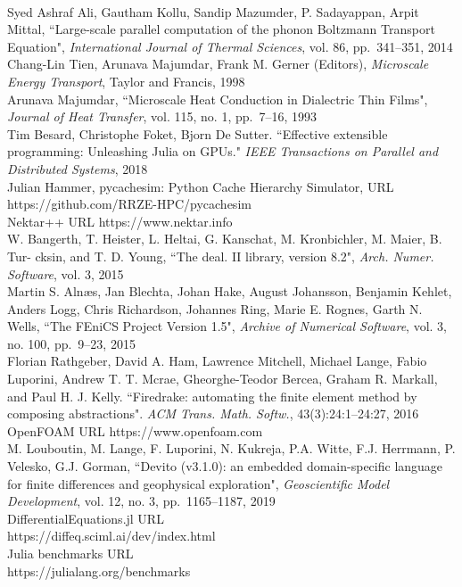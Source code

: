 \documentclass[twoside,leqno,twocolumn]{article}
\begin{document}
\begin{thebibliography}{99}
\\
Syed Ashraf Ali, Gautham Kollu, Sandip Mazumder, P. Sadayappan, Arpit Mittal,
``Large-scale parallel computation of the phonon Boltzmann Transport Equation",
{\em International Journal of Thermal Sciences}, vol. 86, pp.~341--351, 2014
\\
Chang-Lin Tien, Arunava Majumdar, Frank M. Gerner (Editors), {\em Microscale Energy Transport}, Taylor
and Francis, 1998
\\
Arunava Majumdar, ``Microscale Heat Conduction in Dialectric Thin Films", {\em Journal of Heat Transfer}, vol. 115, no. 1, pp.~7--16, 1993
\\
Tim Besard, Christophe Foket, Bjorn De Sutter. ``Effective extensible programming: Unleashing Julia on GPUs." {\em IEEE Transactions on Parallel and Distributed Systems}, 2018
\\
Julian Hammer, pycachesim: Python Cache Hierarchy Simulator, URL https://github.com/RRZE-HPC/pycachesim
\\
Nektar++ URL https://www.nektar.info
\\
W. Bangerth, T. Heister, L. Heltai, G. Kanschat, M. Kronbichler, M. Maier, B. Tur-
cksin, and T. D. Young, ``The deal. II library, version 8.2", {\em Arch. Numer. Software}, vol. 3, 2015
\\
Martin S. Aln{\ae}s, Jan Blechta, Johan Hake, August Johansson, Benjamin Kehlet, Anders Logg, Chris Richardson, Johannes Ring, Marie E. Rognes, Garth N. Wells, ``The FEniCS Project Version 1.5", {\em Archive of Numerical Software}, vol. 3, no. 100, pp.~9--23, 2015
\\
Florian Rathgeber, David A. Ham, Lawrence Mitchell, Michael Lange, Fabio Luporini, Andrew T. T. Mcrae, Gheorghe-Teodor Bercea, Graham R. Markall, and Paul H. J. Kelly. ``Firedrake: automating the finite element method by composing abstractions". {\em ACM Trans. Math. Softw.}, 43(3):24:1–24:27, 2016
\\
OpenFOAM URL https://www.openfoam.com
\\
M. Louboutin, M. Lange, F. Luporini, N. Kukreja, P.A. Witte, F.J. Herrmann, P. Velesko,  G.J. Gorman, ``Devito (v3.1.0): an embedded domain-specific language for finite differences and geophysical exploration", {\em  Geoscientific Model Development}, vol. 12, no. 3, pp.~1165--1187, 2019
\\
DifferentialEquations.jl URL\\
https://diffeq.sciml.ai/dev/index.html
\\
Julia benchmarks URL\\
https://julialang.org/benchmarks
\\
\end{thebibliography}
\end{document}
